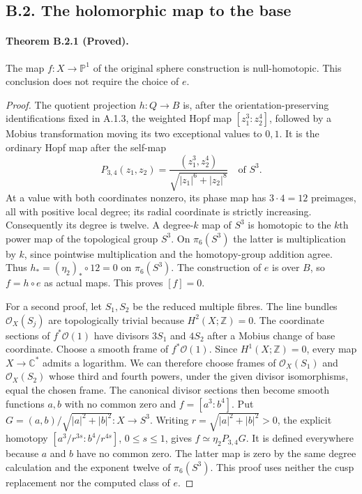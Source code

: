 \subsection{B.2. The holomorphic map to the base}

\paragraph{Theorem B.2.1 (Proved).}
The map $f:X\to\mathbb P^1$ of the original sphere
construction is null-homotopic.  This conclusion does not
require the choice of $e$.

\begin{proof}
The quotient projection $h:Q\to B$ is, after the
orientation-preserving identifications fixed in A.1.3,
the weighted Hopf map
$[z_1^3:z_2^4]$, followed by a Mobius transformation
moving its two exceptional values to $0,1$.
It is the ordinary Hopf map after the self-map
\[
 P_{3,4}(z_1,z_2)=
 \frac{(z_1^3,z_2^4)}{\sqrt{|z_1|^6+|z_2|^8}}
 \quad\text{of }S^3.
 \tag{B.2.1}
\]
At a value with both coordinates nonzero, its phase
map has $3\cdot4=12$ preimages, all with positive local
degree; its radial coordinate is strictly increasing.
Consequently its degree is twelve.  A degree-$k$ map
of $S^3$ is homotopic to the $k$th power map of the
topological group $S^3$.  On $\pi_6(S^3)$ the latter
is multiplication by $k$, since pointwise multiplication
and the homotopy-group addition agree.  Thus
$h_* = (\eta_2)_*\circ12=0$ on $\pi_6(S^3)$.
The construction of $e$ is over $B$, so $f=h\circ e$
as actual maps.  This proves $[f]=0$.

For a second proof, let $S_1,S_2$ be the reduced multiple
fibres.  The line bundles $\mathcal O_X(S_j)$ are
topologically trivial because $H^2(X;\mathbb Z)=0$.
The coordinate sections of $f^*\mathcal O(1)$ have
divisors $3S_1$ and $4S_2$ after a Mobius change of
base coordinate.  Choose a smooth frame of
$f^*\mathcal O(1)$.  Since $H^1(X;\mathbb Z)=0$, every
map $X\to\mathbb C^*$ admits a logarithm.  We can
therefore choose frames of $\mathcal O_X(S_1)$ and
$\mathcal O_X(S_2)$ whose third and fourth powers,
under the given divisor isomorphisms, equal the chosen
frame.  The canonical divisor sections then become
smooth functions $a,b$ with no common zero and
$f=[a^3:b^4]$.  Put
$G=(a,b)/\sqrt{|a|^2+|b|^2}:X\to S^3$.
Writing $r=\sqrt{|a|^2+|b|^2}>0$, the explicit homotopy
$[a^3/r^{3s}:b^4/r^{4s}]$, $0\leq s\leq1$, gives
$f\simeq\eta_2P_{3,4}G$.  It is defined everywhere because
$a$ and $b$ have no common zero.  The latter map is zero
by the same degree calculation and the exponent twelve
of $\pi_6(S^3)$.  This proof uses neither the cusp
replacement nor the computed class of $e$.
\end{proof}

